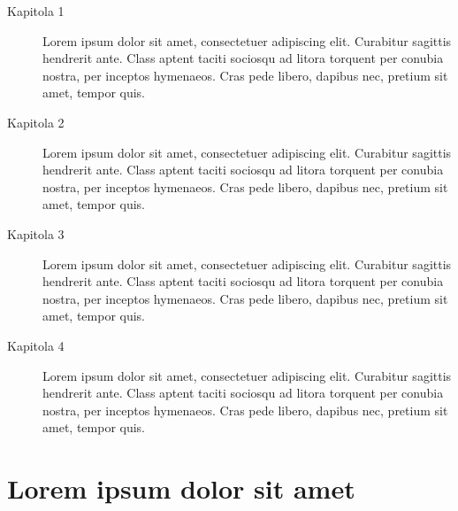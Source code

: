 \begin{description}
\item[Kapitola 1] Lorem ipsum dolor sit amet, consectetuer adipiscing elit. Curabitur sagittis hendrerit ante. Class aptent taciti sociosqu ad litora torquent per conubia nostra, per inceptos hymenaeos. Cras pede libero, dapibus nec, pretium sit amet, tempor quis.

\item[Kapitola 2] Lorem ipsum dolor sit amet, consectetuer adipiscing elit. Curabitur sagittis hendrerit ante. Class aptent taciti sociosqu ad litora torquent per conubia nostra, per inceptos hymenaeos. Cras pede libero, dapibus nec, pretium sit amet, tempor quis.

\item[Kapitola 3] Lorem ipsum dolor sit amet, consectetuer adipiscing elit. Curabitur sagittis hendrerit ante. Class aptent taciti sociosqu ad litora torquent per conubia nostra, per inceptos hymenaeos. Cras pede libero, dapibus nec, pretium sit amet, tempor quis.

\item[Kapitola 4] Lorem ipsum dolor sit amet, consectetuer adipiscing elit. Curabitur sagittis hendrerit ante. Class aptent taciti sociosqu ad litora torquent per conubia nostra, per inceptos hymenaeos. Cras pede libero, dapibus nec, pretium sit amet, tempor quis.
\end{description}

\lipsum[2]

\section{Lorem ipsum dolor sit amet}

\lipsum[3-5]
